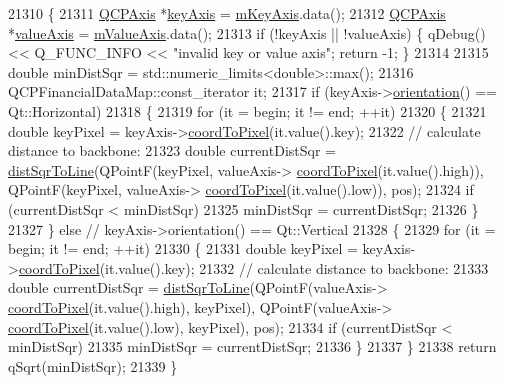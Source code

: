 \begin{DoxyCode}
21310 \{
21311   \hyperlink{class_q_c_p_axis}{QCPAxis} *\hyperlink{class_q_c_p_abstract_plottable_a72c7a09c22963f2c943f07112b311103}{keyAxis} = \hyperlink{class_q_c_p_abstract_plottable_a426f42e254d0f8ce5436a868c61a6827}{mKeyAxis}.data();
21312   \hyperlink{class_q_c_p_axis}{QCPAxis} *\hyperlink{class_q_c_p_abstract_plottable_a3106f9d34d330a6097a8ec5905e5b519}{valueAxis} = \hyperlink{class_q_c_p_abstract_plottable_a2901452ca4aea911a1827717934a4bda}{mValueAxis}.data();
21313   \textcolor{keywordflow}{if} (!keyAxis || !valueAxis) \{ qDebug() << Q\_FUNC\_INFO << \textcolor{stringliteral}{"invalid key or value axis"}; \textcolor{keywordflow}{return} -1; \}
21314 
21315   \textcolor{keywordtype}{double} minDistSqr = std::numeric\_limits<double>::max();
21316   QCPFinancialDataMap::const\_iterator it;
21317   \textcolor{keywordflow}{if} (keyAxis->\hyperlink{class_q_c_p_axis_a57483f2f60145ddc9e63f3af53959265}{orientation}() == Qt::Horizontal)
21318   \{
21319     \textcolor{keywordflow}{for} (it = begin; it != end; ++it)
21320     \{
21321       \textcolor{keywordtype}{double} keyPixel = keyAxis->\hyperlink{class_q_c_p_axis_a985ae693b842fb0422b4390fe36d299a}{coordToPixel}(it.value().key);
21322       \textcolor{comment}{// calculate distance to backbone:}
21323       \textcolor{keywordtype}{double} currentDistSqr = \hyperlink{class_q_c_p_abstract_plottable_a5ea1cab44ca912dcdc96ed81ec5bed5d}{distSqrToLine}(QPointF(keyPixel, valueAxis->
      \hyperlink{class_q_c_p_axis_a985ae693b842fb0422b4390fe36d299a}{coordToPixel}(it.value().high)), QPointF(keyPixel, valueAxis->
      \hyperlink{class_q_c_p_axis_a985ae693b842fb0422b4390fe36d299a}{coordToPixel}(it.value().low)), pos);
21324       \textcolor{keywordflow}{if} (currentDistSqr < minDistSqr)
21325         minDistSqr = currentDistSqr;
21326     \}
21327   \} \textcolor{keywordflow}{else} \textcolor{comment}{// keyAxis->orientation() == Qt::Vertical}
21328   \{
21329     \textcolor{keywordflow}{for} (it = begin; it != end; ++it)
21330     \{
21331       \textcolor{keywordtype}{double} keyPixel = keyAxis->\hyperlink{class_q_c_p_axis_a985ae693b842fb0422b4390fe36d299a}{coordToPixel}(it.value().key);
21332       \textcolor{comment}{// calculate distance to backbone:}
21333       \textcolor{keywordtype}{double} currentDistSqr = \hyperlink{class_q_c_p_abstract_plottable_a5ea1cab44ca912dcdc96ed81ec5bed5d}{distSqrToLine}(QPointF(valueAxis->
      \hyperlink{class_q_c_p_axis_a985ae693b842fb0422b4390fe36d299a}{coordToPixel}(it.value().high), keyPixel), QPointF(valueAxis->
      \hyperlink{class_q_c_p_axis_a985ae693b842fb0422b4390fe36d299a}{coordToPixel}(it.value().low), keyPixel), pos);
21334       \textcolor{keywordflow}{if} (currentDistSqr < minDistSqr)
21335         minDistSqr = currentDistSqr;
21336     \}
21337   \}
21338   \textcolor{keywordflow}{return} qSqrt(minDistSqr);
21339 \}
\end{DoxyCode}


